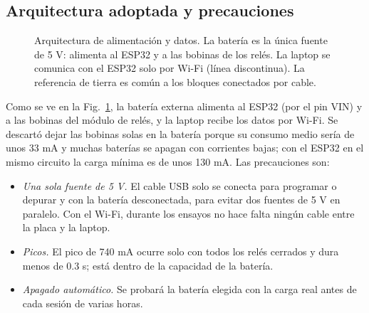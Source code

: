 \documentclass[10pt,letterpaper,twocolumn]{article}
\begin{document}
\subsection{Arquitectura adoptada y precauciones}
\begin{figure}[t]
\centering
{}
\caption{Arquitectura de alimentación y datos. La batería es la única fuente de 5 V: alimenta al ESP32 y a las bobinas de los relés. La laptop se comunica con el ESP32 solo por Wi-Fi (línea discontinua). La referencia de tierra es común a los bloques conectados por cable.}
\label{fig:arq}
\end{figure}

Como se ve en la Fig.~\ref{fig:arq}, la batería externa alimenta al ESP32 (por el pin VIN) y a las bobinas del módulo de relés, y la laptop recibe los datos por Wi-Fi. Se descartó dejar las bobinas solas en la batería porque su consumo medio sería de unos 33 mA y muchas baterías se apagan con corrientes bajas; con el ESP32 en el mismo circuito la carga mínima es de unos 130 mA. Las precauciones son:
\begin{itemize}
\item \emph{Una sola fuente de 5 V.} El cable USB solo se conecta para programar o depurar y con la batería desconectada, para evitar dos fuentes de 5 V en paralelo. Con el Wi-Fi, durante los ensayos no hace falta ningún cable entre la placa y la laptop.
\item \emph{Picos.} El pico de 740 mA ocurre solo con todos los relés cerrados y dura menos de 0.3 s; está dentro de la capacidad de la batería.
\item \emph{Apagado automático.} Se probará la batería elegida con la carga real antes de cada sesión de varias horas.
\end{itemize}
\end{document}
